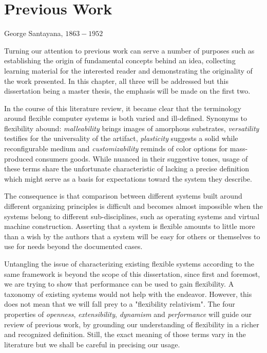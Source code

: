 \chapter{Previous Work}
\label{chap:PreviousWork} 

{George Santayana, $1863-1952$}

Turning our attention to previous work can serve a number of purposes such as
establishing the origin of fundamental concepts behind an idea, collecting
learning material for the interested reader and demonstrating the originality
of the work presented. In this chapter, all three will be addressed but this
dissertation being a master thesis, the emphasis will be made on the first two. 

In the course of this literature review, it became clear that the
terminology around flexible computer systems is both varied and ill-defined.
Synonyms to flexibility abound: \textit{malleability} brings images of
amorphous substrates, \textit{versatility} testifies for the universality of
the artifact, \textit{plasticity} suggests a solid while reconfigurable medium
and \textit{customizability} reminds of color options for mass-produced
consumers goods. While nuanced in their suggestive tones, usage of these terms
share the unfortunate characteristic of lacking a precise definition which
might serve as a basis for expectations toward the system they describe.

The consequence is that comparison between different systems built around
different organizing principles is difficult and becomes almost impossible when
the systems belong to different sub-disciplines, such as operating systems and
virtual machine construction. Asserting that a system is flexible amounts to
little more than a wish by the authors that a system will be easy for others or
themselves to use for needs beyond the documented cases.  

Untangling the issue of characterizing existing flexible systems according to
the same framework is beyond the scope of this dissertation, since first and
foremost, we are trying to show that performance can be used to gain
flexibility. A taxonomy of existing systems would not help with the endeavor.
However, this does not mean that we will fall prey to a "flexibility
relativism". The four properties of \textit{openness}, \textit{extensibility},
\textit{dynamism} and \textit{performance} will guide our review of previous
work, by grounding our understanding of flexibility in a richer and recognized
definition. Still, the exact meaning of those terms vary in the literature but
we shall be careful in precising our usage.

